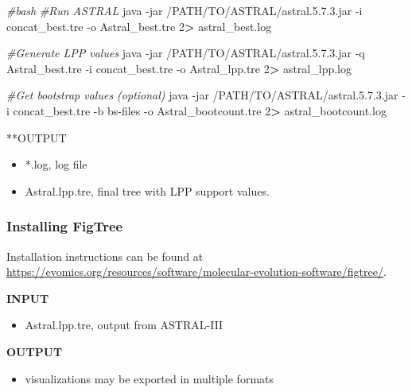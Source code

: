 \documentclass[
  12pt,
]{article}
\newenvironment{Shaded}{\begin{snugshade}}{\end{snugshade}}
\newcommand{\AttributeTok}[1]{\textcolor[rgb]{0.13,0.29,0.53}{#1}}
\newcommand{\CommentTok}[1]{\textcolor[rgb]{0.56,0.35,0.01}{\textit{#1}}}
\newcommand{\DecValTok}[1]{\textcolor[rgb]{0.00,0.00,0.81}{#1}}
\newcommand{\ExtensionTok}[1]{#1}
\newcommand{\NormalTok}[1]{#1}
\newcommand{\OperatorTok}[1]{\textcolor[rgb]{0.81,0.36,0.00}{\textbf{#1}}}
\providecommand{\tightlist}{%
  \setlength{\itemsep}{0pt}\setlength{\parskip}{0pt}}
\begin{document}
\begin{Shaded}
\begin{Highlighting}[]
\CommentTok{\#bash}
\CommentTok{\#Run ASTRAL}
\ExtensionTok{java} \AttributeTok{{-}jar}\NormalTok{ /PATH/TO/ASTRAL/astral.5.7.3.jar  }\AttributeTok{{-}i}\NormalTok{ concat\_best.tre }\AttributeTok{{-}o}\NormalTok{ Astral\_best.tre }\DecValTok{2}\OperatorTok{\textgreater{}}\NormalTok{ astral\_best.log}

\CommentTok{\#Generate LPP values}
\ExtensionTok{java} \AttributeTok{{-}jar}\NormalTok{ /PATH/TO/ASTRAL/astral.5.7.3.jar  }\AttributeTok{{-}q}\NormalTok{ Astral\_best.tre  }\AttributeTok{{-}i}\NormalTok{ concat\_best.tre }\AttributeTok{{-}o}\NormalTok{ Astral\_lpp.tre }\DecValTok{2}\OperatorTok{\textgreater{}}\NormalTok{ astral\_lpp.log}

\CommentTok{\#Get bootstrap values (optional)}
\ExtensionTok{java} \AttributeTok{{-}jar}\NormalTok{ /PATH/TO/ASTRAL/astral.5.7.3.jar  }\AttributeTok{{-}i}\NormalTok{ concat\_best.tre }\AttributeTok{{-}b}\NormalTok{ bs{-}files }\AttributeTok{{-}o}\NormalTok{ Astral\_bootcount.tre }\DecValTok{2}\OperatorTok{\textgreater{}}\NormalTok{ astral\_bootcount.log}
\end{Highlighting}
\end{Shaded}

**OUTPUT

\begin{itemize}
\tightlist
\item
  *.log, log file
\item
  Astral.lpp.tre, final tree with LPP support values.
\end{itemize}

\hypertarget{installing-figtree-1}{%
\subsubsection{Installing FigTree}\label{installing-figtree-1}}

Installation instructions can be found at \url{https://evomics.org/resources/software/molecular-evolution-software/figtree/}.

\textbf{INPUT}

\begin{itemize}
\tightlist
\item
  Astral.lpp.tre, output from ASTRAL-III
\end{itemize}

\textbf{OUTPUT}

\begin{itemize}
\tightlist
\item
  visualizations may be exported in multiple formats
\end{itemize}
\end{document}
